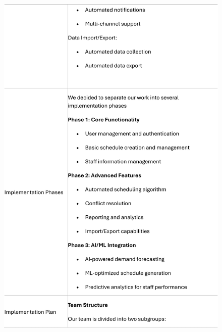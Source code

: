 \documentclass[a4paper,12pt, oneside]{report}
\begin{document}
\begin{appendices}
\begin{figure}[H]
    \includegraphics[width=\textwidth]{Minutes/Minutes_3-cropped-3.png}
\end{figure}
\newpage
\begin{figure}[H]
    \centering

\end{figure}
\end{appendices}
\end{document}
